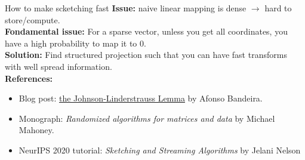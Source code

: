 \documentclass{beamer}
\begin{document}
    \begin{frame}{How to make scketching fast}
        \textbf{Issue:} naive linear mapping is dense $\to$ hard to store/compute.\\[.5em]

        \textbf{Fondamental issue:} For a sparse vector, unless you get all coordinates, you have a high probability to map it to 0.\\[.5em]

        \textbf{Solution:} Find structured projection such that you can have fast transforms with well spread information.\\[1em]

        \textbf{References:}
        \begin{itemize}
            \item Blog post: \href{https://afonsobandeira.wordpress.com/2013/09/13/the-johnson-lindenstrauss-lemma/}{the Johnson-Linderstrauss Lemma} by Afonso Bandeira.
            \item Monograph: \emph{Randomized algorithms for matrices and data} by Michael Mahoney.
            \item NeurIPS 2020 tutorial: \emph{Sketching and Streaming Algorithms} by Jelani Nelson
        \end{itemize}

    \end{frame}
\end{document}
